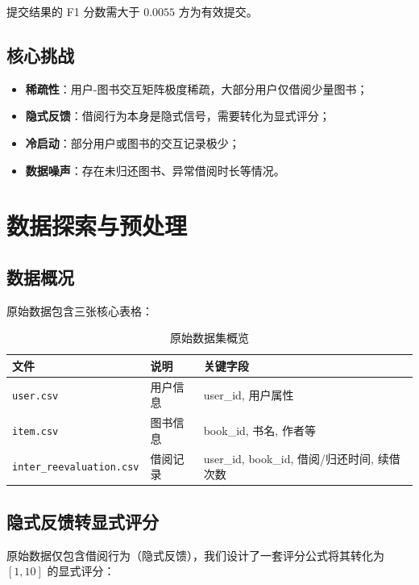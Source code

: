 \documentclass[12pt,a4paper]{article}
\begin{document}
提交结果的 F1 分数需大于 $0.0055$ 方为有效提交。

\subsection{核心挑战}

\begin{itemize}[leftmargin=2em]
    \item \textbf{稀疏性}：用户-图书交互矩阵极度稀疏，大部分用户仅借阅少量图书；
    \item \textbf{隐式反馈}：借阅行为本身是隐式信号，需要转化为显式评分；
    \item \textbf{冷启动}：部分用户或图书的交互记录极少；
    \item \textbf{数据噪声}：存在未归还图书、异常借阅时长等情况。
\end{itemize}

\section{数据探索与预处理}

\subsection{数据概况}

原始数据包含三张核心表格：

\begin{table}[H]
\centering
\caption{原始数据集概览}
\begin{tabular}{lll}
\toprule
\textbf{文件} & \textbf{说明} & \textbf{关键字段} \\
\midrule
\texttt{user.csv} & 用户信息 & user\_id, 用户属性 \\
\texttt{item.csv} & 图书信息 & book\_id, 书名, 作者等 \\
\texttt{inter\_reevaluation.csv} & 借阅记录 & user\_id, book\_id, 借阅/归还时间, 续借次数 \\
\bottomrule
\end{tabular}
\end{table}

\subsection{隐式反馈转显式评分}

原始数据仅包含借阅行为（隐式反馈），我们设计了一套评分公式将其转化为 $[1, 10]$ 的显式评分：
\end{document}
